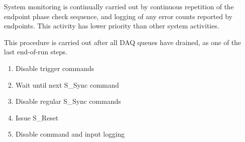 \documentclass{dune}
\begin{document}

System monitoring is continually carried out by continuous repetition of the endpoint phase check sequence, and logging of any error counts reported by endpoints. This activity has lower priority than other system activities.


This procedure is carried out after all DAQ queues have drained, as one of the last end-of-run steps.

\begin{enumerate} 
	\item Disable trigger commands
	\item Wait until next S\_Sync command
	\item Disable regular S\_Sync commands
	\item Issue S\_Reset
	\item Disable command and input logging
\end{enumerate}




\clearpage

\printglossary
\printbibliography
\end{document}
